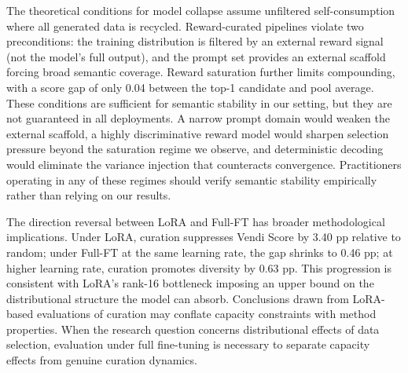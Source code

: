 The theoretical conditions for model collapse \cite{placeholder_shumailov} assume unfiltered self-consumption where all generated data is recycled. Reward-curated pipelines violate two preconditions: the training distribution is filtered by an external reward signal (not the model's full output), and the prompt set provides an external scaffold forcing broad semantic coverage. Reward saturation further limits compounding, with a score gap of only 0.04 between the top-1 candidate and pool average. These conditions are sufficient for semantic stability in our setting, but they are not guaranteed in all deployments. A narrow prompt domain would weaken the external scaffold, a highly discriminative reward model would sharpen selection pressure beyond the saturation regime we observe, and deterministic decoding would eliminate the variance injection that counteracts convergence. Practitioners operating in any of these regimes should verify semantic stability empirically rather than relying on our results.

The direction reversal between LoRA and Full-FT has broader methodological implications. Under LoRA, curation suppresses Vendi Score by 3.40 pp relative to random; under Full-FT at the same learning rate, the gap shrinks to 0.46 pp; at higher learning rate, curation promotes diversity by 0.63 pp. This progression is consistent with LoRA's rank-16 bottleneck imposing an upper bound on the distributional structure the model can absorb. Conclusions drawn from LoRA-based evaluations of curation may conflate capacity constraints with method properties. When the research question concerns distributional effects of data selection, evaluation under full fine-tuning is necessary to separate capacity effects from genuine curation dynamics.
